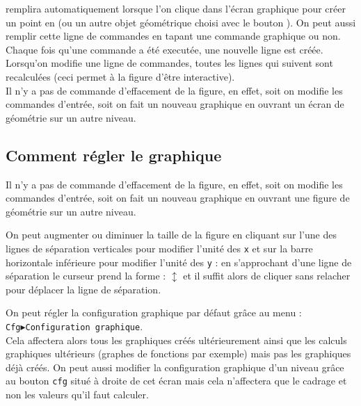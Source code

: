 \documentclass[a4paper,11pt]{article}
\begin{document}
\begin{itemize}
remplira automatiquement lorsque l'on clique dans l'\'ecran graphique pour
cr\'eer un point en  (ou un autre objet 
g\'eom\'etrique choisi avec le bouton ). On peut aussi 
remplir cette ligne de commandes en tapant une commande graphique ou non. 
Chaque fois qu'une commande a \'et\'e execut\'ee, une nouvelle ligne est 
cr\'e\'ee. Lorsqu'on modifie une ligne de commandes, toutes les lignes
qui suivent sont recalcul\'ees (ceci permet \`a la figure d'\^etre
interactive).\\
Il n'y a pas de commande d'effacement de la figure, 
en effet, soit on modifie les commandes 
d'entr\'ee, soit on fait un nouveau graphique en ouvrant un \'ecran de 
g\'eom\'etrie sur un autre niveau.
\end{itemize}

\subsection{Comment r\'egler le graphique}
Il n'y a pas de commande d'effacement de la figure, 
en effet, soit on modifie les commandes d'entr\'ee, soit on fait un nouveau 
graphique en ouvrant une figure de g\'eom\'etrie sur un autre niveau.

On peut augmenter ou diminuer la taille de la 
figure en cliquant sur l'une des lignes de s\'eparation verticales pour 
modifier l'unit\'e des {\tt x} et sur la barre horizontale inf\'erieure pour 
modifier l'unit\'e des {\tt y} : en s'approchant d'une 
ligne de s\'eparation le curseur prend la forme : $\updownarrow$ et il suffit 
alors de cliquer sans relacher pour d\'eplacer la ligne de s\'eparation.

On peut r\'egler la configuration graphique par d\'efaut
gr\^ace au menu :\\
{\tt Cfg$\blacktriangleright$Configuration graphique}.\\ 
Cela affectera alors tous les
graphiques cr\'e\'es ult\'erieurement ainsi que les calculs graphiques 
ult\'erieurs (graphes de fonctions par exemple) mais pas les graphiques 
d\'ej\`a cr\'e\'es. On peut aussi modifier la configuration graphique d'un
niveau gr\^ace au bouton {\tt cfg} situ\'e \`a droite de cet \'ecran mais cela 
n'affectera que le cadrage et non les valeurs qu'il faut calculer.
\end{document}
